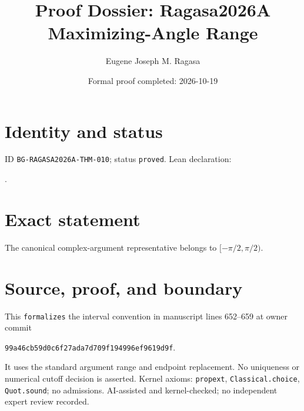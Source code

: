 \documentclass[11pt]{article}
\title{Proof Dossier: Ragasa2026A Maximizing-Angle Range}\author{Eugene Joseph M. Ragasa}\date{Formal proof completed: 2026-10-19}
\begin{document}
\maketitle
\section{Identity and status}
ID \texttt{BG-RAGASA2026A-THM-010}; status \texttt{proved}. Lean declaration:
\par{}.
\section{Exact statement}
The canonical complex-argument representative belongs to
$[-\pi/2,\pi/2)$.
\section{Source, proof, and boundary}
This \texttt{formalizes} the interval convention in manuscript lines 652--659 at owner commit
\begin{center}\small\texttt{99a46cb59d0c6f27ada7d709f194996ef9619d9f}.\end{center}
It uses the standard argument range
and endpoint replacement. No uniqueness or numerical cutoff decision is asserted.
Kernel axioms: \texttt{propext}, \texttt{Classical.choice}, \texttt{Quot.sound}; no
admissions. AI-assisted and kernel-checked; no independent expert review recorded.
\end{document}
